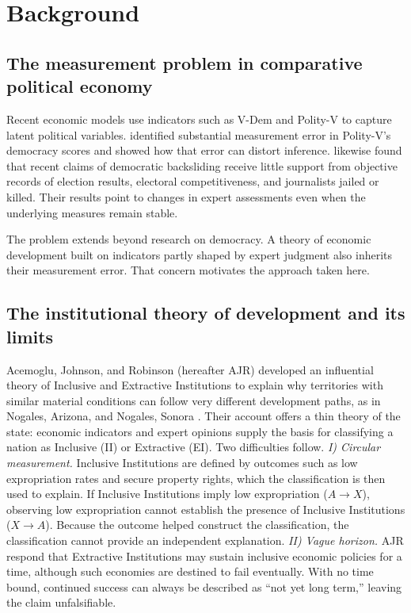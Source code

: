 \documentclass[11pt]{article}
\begin{document}
\section{Background}
\label{sec:background}

\subsection{The measurement problem in comparative political economy}

Recent economic models use indicators such as V-Dem and Polity-V to capture latent political variables. \textcite{treier_jackman_2008} identified substantial measurement error in Polity-V's democracy scores and showed how that error can distort inference. \textcite{little_meng_2024} likewise found that recent claims of democratic backsliding receive little support from objective records of election results, electoral competitiveness, and journalists jailed or killed. Their results point to changes in expert assessments even when the underlying measures remain stable.

The problem extends beyond research on democracy. A theory of economic development built on indicators partly shaped by expert judgment also inherits their measurement error. That concern motivates the approach taken here.

\subsection{The institutional theory of development and its limits}

Acemoglu, Johnson, and Robinson (hereafter AJR) developed an influential theory of Inclusive and Extractive Institutions to explain why territories with similar material conditions can follow very different development paths, as in Nogales, Arizona, and Nogales, Sonora \parencite{acemoglu_johnson_robinson_2001,acemoglu_johnson_robinson_2005,acemoglu_robinson_2012}. Their account offers a thin theory of the state: economic indicators and expert opinions supply the basis for classifying a nation as Inclusive (II) or Extractive (EI). Two difficulties follow. \textit{I) Circular measurement.} Inclusive Institutions are defined by outcomes such as low expropriation rates and secure property rights, which the classification is then used to explain. If Inclusive Institutions imply low expropriation ($A \to X$), observing low expropriation cannot establish the presence of Inclusive Institutions ($X \to A$). Because the outcome helped construct the classification, the classification cannot provide an independent explanation. \textit{II) Vague horizon.} AJR respond that Extractive Institutions may sustain inclusive economic policies for a time, although such economies are destined to fail eventually. With no time bound, continued success can always be described as ``not yet long term,'' leaving the claim unfalsifiable.
\end{document}
